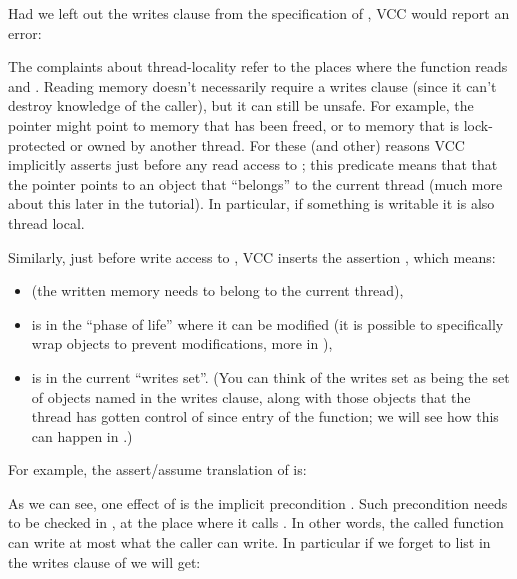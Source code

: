 Had we left out the writes clause from the specification of
, VCC would report an error:


\noindent
The complaints about thread-locality refer to the places where the function
reads  and . 
Reading memory doesn't necessarily require a writes clause (since it can't
destroy knowledge of the caller), but it can still be unsafe. 
For example, the pointer might point to memory that has been freed, or to
memory that is lock-protected or owned by another thread. 
For these (and other) reasons VCC implicitly
asserts  just before any read access to ;
this predicate means that that the pointer points to an object that
``belongs'' to the current thread (much more about this later in the tutorial).
In particular, if something is writable it is also thread local.

Similarly, just before write access to , VCC inserts the
assertion , which means:
\begin{itemize}
\item {} (the written memory needs to belong to the current thread),
\item {} is in the ``phase of life'' where it can be modified (it is possible
to specifically wrap objects to prevent modifications, more in ),
\item {} is in the current ``writes set''. (You can think of
the writes set as being the set of objects named in the writes clause,
along with those objects that the thread has gotten control of since
entry of the function; we will see how this can happen in .)
\end{itemize}
For example, the assert/assume translation of  is:


\noindent
As we can see, one effect of  is the implicit
precondition . Such precondition
needs to be checked in , at the place where it calls .
In other words, the called function can write at most what the caller can write.
In particular if we forget to list  in the writes
clause of  we will get:




